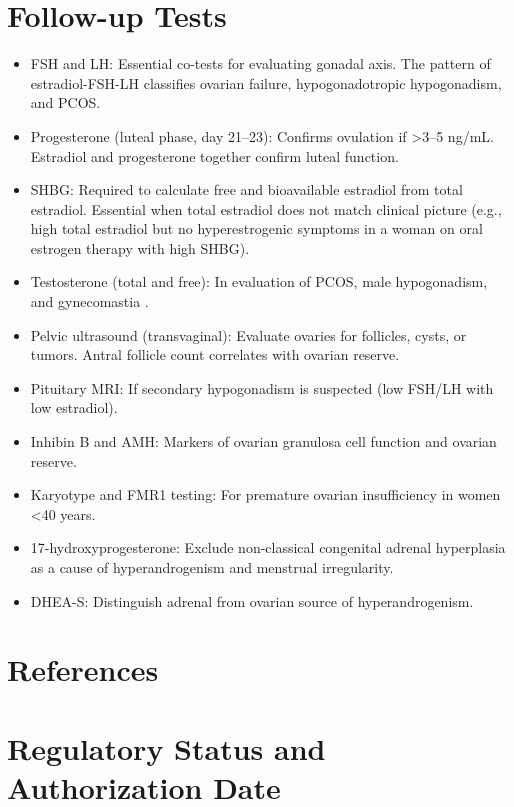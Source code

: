 \section*{Follow-up Tests}
\begin{itemize}
  \item FSH and LH: Essential co-tests for evaluating gonadal axis. The pattern of estradiol-FSH-LH classifies ovarian failure, hypogonadotropic hypogonadism, and PCOS.
  \item Progesterone (luteal phase, day 21--23): Confirms ovulation if >3--5 ng/mL. Estradiol and progesterone together confirm luteal function.
  \item SHBG: Required to calculate free and bioavailable estradiol from total estradiol. Essential when total estradiol does not match clinical picture (e.g., high total estradiol but no hyperestrogenic symptoms in a woman on oral estrogen therapy with high SHBG).
  \item Testosterone (total and free): In evaluation of PCOS, male hypogonadism, and gynecomastia \cite{bhasin2018testosterone}.
  \item Pelvic ultrasound (transvaginal): Evaluate ovaries for follicles, cysts, or tumors. Antral follicle count correlates with ovarian reserve.
  \item Pituitary MRI: If secondary hypogonadism is suspected (low FSH/LH with low estradiol).
  \item Inhibin B and AMH: Markers of ovarian granulosa cell function and ovarian reserve.
  \item Karyotype and FMR1 testing: For premature ovarian insufficiency in women <40 years.
  \item 17-hydroxyprogesterone: Exclude non-classical congenital adrenal hyperplasia as a cause of hyperandrogenism and menstrual irregularity.
  \item DHEA-S: Distinguish adrenal from ovarian source of hyperandrogenism.
\end{itemize}

\section*{References}



\clearpage
\section*{Regulatory Status and Authorization Date}

\clearpage
